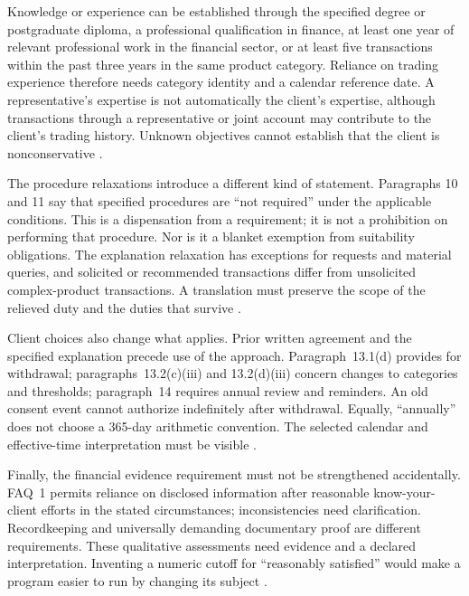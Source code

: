 Knowledge or experience can be established through the specified degree or
postgraduate diploma, a professional qualification in finance, at least one
year of relevant professional work in the financial sector, or at least five
transactions within the past three years in the same product category.
Reliance on trading experience therefore needs category identity and a calendar
reference date. A representative's expertise is not automatically the client's
expertise, although transactions through a representative or joint account may
contribute to the client's trading history. Unknown objectives cannot establish
that the client is nonconservative
\citep[paras.~4.1, 5.1 and 7.3]{sfcspiannex1}
\citep[FAQ~2]{sfcspiannex2}.

The procedure relaxations introduce a different kind of statement. Paragraphs
10 and 11 say that specified procedures are ``not required'' under the
applicable conditions. This is a dispensation from a requirement; it is not
a prohibition on performing that procedure. Nor is it a blanket exemption
from suitability obligations. The explanation relaxation has exceptions for
requests and material queries, and solicited or recommended transactions differ
from unsolicited complex-product transactions. A translation must preserve the
scope of the relieved duty and the duties that survive
\citep[paras.~10--11]{sfcspiannex1}.

Client choices also change what applies. Prior written agreement and the
specified explanation precede use of the approach. Paragraph~13.1(d) provides
for withdrawal; paragraphs~13.2(c)(iii) and 13.2(d)(iii) concern changes to
categories and thresholds; paragraph~14 requires annual review and reminders.
An old consent event cannot authorize indefinitely after withdrawal. Equally,
``annually'' does not choose a 365-day arithmetic convention. The selected
calendar and effective-time interpretation must be visible
\citep[paras.~13--14]{sfcspiannex1}.

Finally, the financial evidence requirement must not be strengthened
accidentally. FAQ~1 permits reliance on disclosed information after reasonable
know-your-client efforts in the stated circumstances; inconsistencies need
clarification. Recordkeeping and universally demanding documentary proof are
different requirements. These qualitative assessments need evidence and a
declared interpretation. Inventing a numeric cutoff for ``reasonably satisfied''
would make a program easier to run by changing its subject
\citep[FAQ~1]{sfcspiannex2}.

